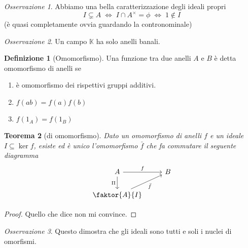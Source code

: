 \documentclass[a4paper]{article}
\newtheorem{theorem}{Teorema}[section]
\theoremstyle{remark}
\newtheorem*{remark}{Osservazione}
\theoremstyle{definition}
\newtheorem{definition}[theorem]{Definizione}
\begin{document}
\begin{multicols}{2}
\begin{remark}
	Abbiamo una bella caratterizzazione degli ideali propri
	\[ I \subsetneq A \;\Leftrightarrow\; I \cap A^\times = \phi \;\Leftrightarrow\; 1 \notin I \]
	(è quasi completamente ovvia guardando la contronominale)
\end{remark}


\begin{remark}
	Un campo $ \mathbb{K} $ ha solo anelli banali.
\end{remark}

\begin{definition}[Omomorfismo]
	Una funzione tra due anelli $ A $ e $ B $ è detta omomorfismo di anelli se
	\begin{enumerate}
		\item è omomorfismo dei rispettivi gruppi additivi.
		\item $ f(ab)=f(a)f(b) $
		\item $ f(1_A)=f(1_B) $
	\end{enumerate}
\end{definition}

\begin{theorem}[di omomorfismo]\label{omoanelli}
	Dato un omomorfismo di anelli $ f $ e un ideale $ I \subseteq \ker f $, esiste ed è unico l'omomorfismo $ \bar{f} $ che fa commutare il seguente diagramma
	\[ \begin{tikzcd}
	A \arrow{r}{f} \arrow[swap]{d}{\Pi} & B \\
	\faktor{A}{I} \arrow[swap]{ru}{\bar{f}}
	\end{tikzcd} \]
\end{theorem}
\begin{proof}
	Quello che dice non mi convince.
\end{proof}
\begin{remark}
	Questo dimostra che gli ideali sono tutti e soli i nuclei di omorfismi.
\end{remark}


\end{multicols}
\end{document}
